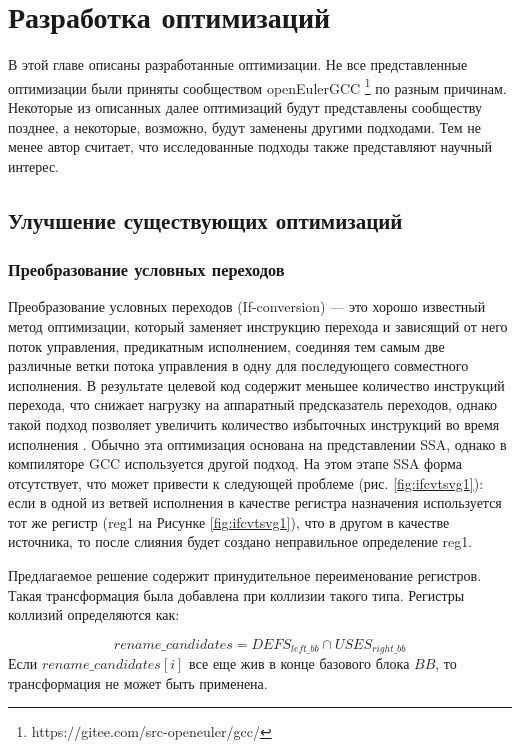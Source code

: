 \chapter{Разработка оптимизаций}\label{ch:ch2}

В этой главе описаны разработанные оптимизации. Не все представленные оптимизации были приняты сообществом openEulerGCC \footnote{https://gitee.com/src-openeuler/gcc/} по разным причинам. Некоторые из описанных далее оптимизаций будут представлены сообществу позднее, а некоторые, возможно, будут заменены другими подходами. Тем не менее автор считает, что исследованные подходы также представляют научный интерес.


\section{Улучшение существующих оптимизаций}\label{sec:ch2/sect1}
\subsection{Преобразование условных переходов} \label{opt:ifconv}
Преобразование условных переходов (If-conversion) — это хорошо известный метод оптимизации, который заменяет инструкцию перехода и зависящий от него поток управления, предикатным исполнением, соединяя тем самым две различные ветки потока управления в одну для последующего совместного исполнения.  В результате целевой код содержит меньшее количество инструкций перехода, что снижает нагрузку на аппаратный предсказатель переходов, однако такой подход позволяет увеличить количество избыточных инструкций во время исполнения \cite{bruel2021if,E240105}. Обычно эта оптимизация основана на представлении SSA, однако в компиляторе GCC используется другой подход. На этом этапе SSA форма отсутствует, что может привести к следующей проблеме (рис. \ref{fig:ifcvtsvg1}): если в одной из ветвей исполнения в качестве регистра назначения используется  тот же регистр (reg1 на
Рисунке \ref{fig:ifcvtsvg1}), что в другом в качестве источника, то после слияния будет создано неправильное определение reg1.

Предлагаемое решение содержит принудительное переименование регистров. Такая трансформация была добавлена при коллизии такого типа. Регистры коллизий определяются как:

$$rename\_candidates = DEFS_{left\_bb} \cap USES_{right\_bb} $$
Если $rename\_candidates[i]$ все еще жив в конце базового блока $BB$, то трансформация не может быть применена.


